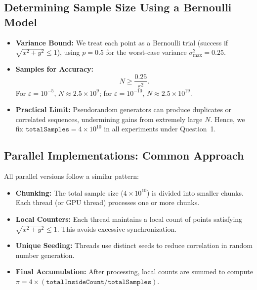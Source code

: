 \documentclass[12pt]{article}
\begin{document}
\subsection{Determining Sample Size Using a Bernoulli Model}\label{sec:bernoulli}
\begin{itemize}
    \item \textbf{Variance Bound:} We treat each point as a Bernoulli trial (success if
          \(\sqrt{x^2 + y^2}\le 1\)), using \(p=0.5\) for the worst-case variance
          \(\sigma^2_{\max}=0.25\).
    \item \textbf{Samples for Accuracy:}
          \[
              N \ge \frac{0.25}{\varepsilon^2}.
          \]
          For \(\varepsilon=10^{-5}\), \(N\approx 2.5\times10^9\); for
          \(\varepsilon=10^{-10}\), \(N\approx2.5\times10^{19}\).
    \item \textbf{Practical Limit:} Pseudorandom generators can produce duplicates or
          correlated sequences, undermining gains from extremely large \(N\). Hence, we fix
          \(\texttt{totalSamples}=4\times10^{10}\) in all experiments under Question~1.
\end{itemize}

\subsection{Parallel Implementations: Common Approach}
All parallel versions follow a similar pattern:
\begin{itemize}
    \item \textbf{Chunking:} The total sample size (\(4\times10^{10}\)) is divided into
          smaller chunks. Each thread (or GPU thread) processes one or more chunks.
    \item \textbf{Local Counters:} Each thread maintains a local count of points
          satisfying \(\sqrt{x^2 + y^2}\le 1\). This avoids excessive synchronization.
    \item \textbf{Unique Seeding:} Threads use distinct seeds to reduce correlation in
          random number generation.
    \item \textbf{Final Accumulation:} After processing, local counts are summed to
          compute \(\pi = 4 \times (\texttt{totalInsideCount} / \texttt{totalSamples})\).
\end{itemize}
\end{document}
